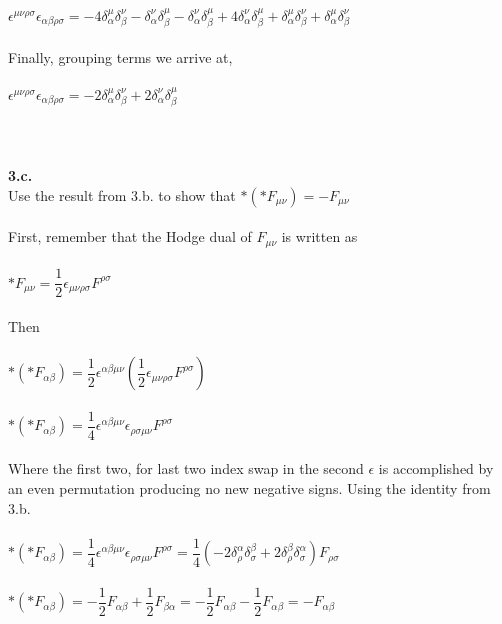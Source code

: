 \documentclass[prb,preprint]
{revtex4-1}
\newcommand{\PRLsep}{\noindent\makebox[\linewidth]{\resizebox{0.8888\linewidth}{2pt}{$\bullet$}}\bigskip}
\begin{document}
$\epsilon^{\mu\nu\rho\sigma}\epsilon_{\alpha\beta\rho\sigma} = -4\delta^\mu_\alpha \delta^\nu_\beta - \delta^\nu_\alpha \delta^\mu_\beta - \delta^\nu_\alpha \delta^\mu_\beta + 4\delta^\nu_\alpha \delta^\mu_\beta + \delta^\mu_\alpha \delta^\nu_\beta + \delta^\mu_\alpha \delta^\nu_\beta$
\\
\\
Finally, grouping terms we arrive at,
\\
\\
$\epsilon^{\mu\nu\rho\sigma}\epsilon_{\alpha\beta\rho\sigma} = -2\delta^\mu_\alpha \delta^\nu_\beta + 2\delta^\nu_\alpha \delta^\mu_\beta$
\\
\\
\PRLsep
\\
\\
\newpage
\textbf{3.c.}
\\
Use the result from 3.b. to show that $*\left(*F_{\mu\nu}\right) = -F_{\mu\nu}$
\\
\\
First, remember that the Hodge dual of $F_{\mu\nu}$ is written as 
\\
\\
$*F_{\mu\nu} = \dfrac{1}{2} \epsilon_{\mu\nu\rho\sigma} F^{\rho\sigma}$
\\
\\
Then
\\
\\
$*\left(*F_{\alpha\beta}\right) = \dfrac{1}{2} \epsilon^{\alpha\beta\mu\nu} \left(\dfrac{1}{2} \epsilon_{\mu\nu\rho\sigma} F^{\rho\sigma}\right)$
\\
\\
$*\left(*F_{\alpha\beta}\right) = \dfrac{1}{4} \epsilon^{\alpha\beta\mu\nu}\epsilon_{\rho\sigma\mu\nu} F^{\rho\sigma}$
\\
\\
Where the first two, for last two index swap in the second $\epsilon$ is accomplished by an even permutation producing no new negative signs.  Using the identity from 3.b.
\\
\\
$*\left(*F_{\alpha\beta}\right) = \dfrac{1}{4} \epsilon^{\alpha\beta\mu\nu}\epsilon_{\rho\sigma\mu\nu} F^{\rho\sigma} = \dfrac{1}{4} \left(-2\delta^\alpha_\rho \delta^\beta_\sigma + 2\delta^\beta_\rho \delta^\alpha_\sigma \right) F_{\rho\sigma}$
\\
\\
$*\left(*F_{\alpha\beta}\right) = -\dfrac{1}{2} F_{\alpha\beta} + \dfrac{1}{2} F_{\beta\alpha} = -\dfrac{1}{2} F_{\alpha\beta} - \dfrac{1}{2} F_{\alpha\beta} = -F_{\alpha\beta}$
\\
\\
\end{document}
